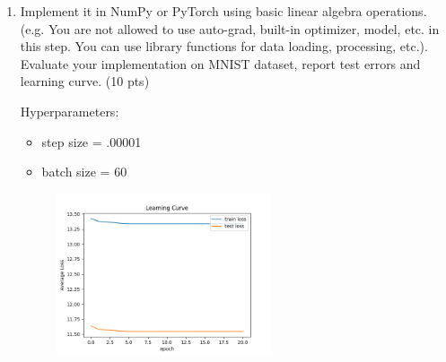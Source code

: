 \documentclass[a4paper]{article}
\theoremstyle{definition}
\newenvironment{soln}{
    \leavevmode\color{blue}\ignorespaces
}{}
\begin{document}
\begin{enumerate}
    \item Implement it in NumPy or PyTorch using basic linear algebra operations. (e.g. You are not allowed to use auto-grad, built-in optimizer, model, etc. in this step. You can use library functions for data loading, processing, etc.). Evaluate your implementation on MNIST dataset, report test errors and learning curve. (10 pts)
    
    \begin{soln}

        Hyperparameters:
        \begin{itemize}
            \item step size = .00001
            \item batch size = 60 
        \end{itemize}

        \begin{figure}[H]
			\centering
			\includegraphics[width=0.6\textwidth]{../figs/learning_curve.png}
		\end{figure}


\end{soln}
\end{enumerate}
\end{document}
